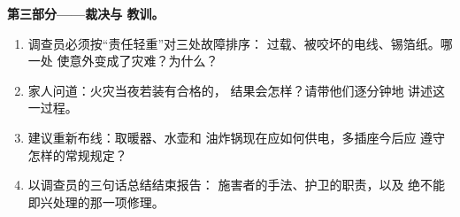 \begin{problem}
\medskip\noindent\textbf{第三部分——裁决与
教训。}
\begin{enumerate}[resume]
  \item 调查员必须按“责任轻重”对三处故障排序：
        过载、被咬坏的电线、锡箔纸。哪一处
        使意外变成了灾难？为什么？
  \item 家人问道：火灾当夜若装有合格的，
        结果会怎样？请带他们逐分钟地
        讲述这一过程。
  \item 建议重新布线：取暖器、水壶和
        油炸锅现在应如何供电，多插座今后应
        遵守怎样的常规规定？
  \item 以调查员的三句话总结结束报告：
        施害者的手法、护卫的职责，以及
        绝不能即兴处理的那一项修理。
\end{enumerate}
\end{problem}
